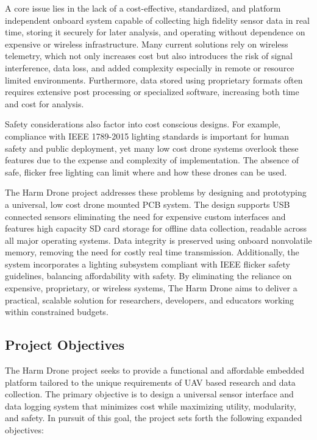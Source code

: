 \documentclass[12pt]{article}
\begin{document}
\par A core issue lies in the lack of a cost-effective, standardized, and platform independent onboard system capable of collecting high fidelity sensor data in real time, storing it securely for later analysis, and operating without dependence on expensive or wireless infrastructure. Many current solutions rely on wireless telemetry, which not only increases cost but also introduces the risk of signal interference, data loss, and added complexity especially in remote or resource limited environments. Furthermore, data stored using proprietary formats often requires extensive post processing or specialized software, increasing both time and cost for analysis.

\par Safety considerations also factor into cost conscious designs. For example, compliance with IEEE 1789-2015 lighting standards is important for human safety and public deployment, yet many low cost drone systems overlook these features due to the expense and complexity of implementation. The absence of safe, flicker free lighting can limit where and how these drones can be used.

\par The Harm Drone project addresses these problems by designing and prototyping a universal, low cost drone mounted PCB system. The design supports USB connected sensors eliminating the need for expensive custom interfaces and features high capacity SD card storage for offline data collection, readable across all major operating systems. Data integrity is preserved using onboard nonvolatile memory, removing the need for costly real time transmission. Additionally, the system incorporates a lighting subsystem compliant with IEEE flicker safety guidelines, balancing affordability with safety. By eliminating the reliance on expensive, proprietary, or wireless systems, The Harm Drone aims to deliver a practical, scalable solution for researchers, developers, and educators working within constrained budgets.

\subsection{Project Objectives}

\par The Harm Drone project seeks to provide a functional and affordable embedded platform tailored to the unique requirements of UAV based research and data collection. The primary objective is to design a universal sensor interface and data logging system that minimizes cost while maximizing utility, modularity, and safety. In pursuit of this goal, the project sets forth the following expanded objectives:
\end{document}
